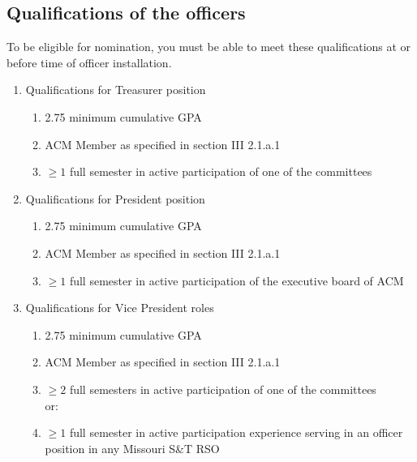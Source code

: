   \subsection{Qualifications of the officers}
    To be eligible for nomination, you must be able to meet these qualifications at or before
    time of officer installation.
    \begin{enumerate}[label=\arabic*.]
      \item Qualifications for Treasurer position
        \begin{enumerate}[label=\arabic*.]
          \item 2.75 minimum cumulative GPA
          \item ACM Member as specified in section III 2.1.a.1
          \item $\geq{1}$ full semester in active participation of one of the
          committees
        \end{enumerate}
      \item Qualifications for President position
        \begin{enumerate}[label=\arabic*.]
          \item 2.75 minimum cumulative GPA
          \item ACM Member as specified in section III 2.1.a.1
          \item $\geq{1}$ full semester in active participation of the executive
          board of ACM
        \end{enumerate}
      \item Qualifications for Vice President roles
        \begin{enumerate}[label=\arabic*.]
          \item 2.75 minimum cumulative GPA
          \item ACM Member as specified in section III 2.1.a.1
          \item $\geq{2}$ full semesters in active participation of one of the
          committees\\
          or:
          \item $\geq{1}$ full semester in active participation experience
          serving in an officer position in any Missouri S\&T RSO
        \end{enumerate}
    \end{enumerate}


